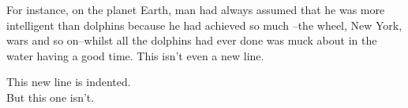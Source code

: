 \documentclass{article}
\begin{document}
For instance, on the planet Earth, man had always assumed that 
he was more intelligent than dolphins because he had achieved so much
--the wheel, New York, wars and so on--whilst all the dolphins had 
ever done was muck about in the water having a good time.
This isn't even a new line.  
	
This new line is indented.
\\
But this one isn't.
\end{document}
